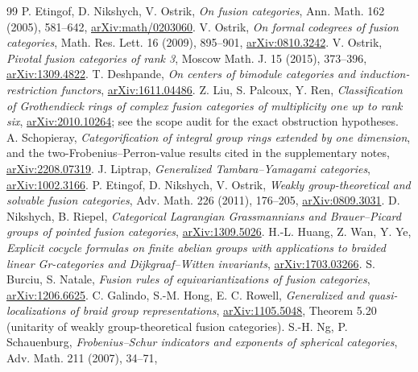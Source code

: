 \documentclass[11pt]{article}
\begin{document}
\begin{thebibliography}{99}
 P. Etingof, D. Nikshych, V. Ostrik,
\emph{On fusion categories}, Ann. Math. 162 (2005), 581--642,
\href{https://arxiv.org/abs/math/0203060}{arXiv:math/0203060}.
 V. Ostrik, \emph{On formal codegrees of fusion
categories}, Math. Res. Lett. 16 (2009), 895--901,
\href{https://arxiv.org/abs/0810.3242}{arXiv:0810.3242}.
 V. Ostrik, \emph{Pivotal fusion categories of rank 3},
Moscow Math. J. 15 (2015), 373--396,
\href{https://arxiv.org/abs/1309.4822}{arXiv:1309.4822}.
 T. Deshpande, \emph{On centers of bimodule categories
and induction-restriction functors},
\href{https://arxiv.org/abs/1611.04486}{arXiv:1611.04486}.
 Z. Liu, S. Palcoux, Y. Ren, \emph{Classification of Grothendieck
rings of complex fusion categories of multiplicity one up to rank six},
\href{https://arxiv.org/abs/2010.10264}{arXiv:2010.10264}; see the scope
audit for the exact obstruction hypotheses.
 A. Schopieray, \emph{Categorification of integral
group rings extended by one dimension}, and the two-Frobenius--Perron-value
results cited in the supplementary notes,
\href{https://arxiv.org/abs/2208.07319}{arXiv:2208.07319}.
 J. Liptrap, \emph{Generalized Tambara--Yamagami categories},
\href{https://arxiv.org/abs/1002.3166}{arXiv:1002.3166}.
 P. Etingof, D. Nikshych, V. Ostrik,
\emph{Weakly group-theoretical and solvable fusion categories},
Adv. Math. 226 (2011), 176--205,
\href{https://arxiv.org/abs/0809.3031}{arXiv:0809.3031}.
 D. Nikshych, B. Riepel, \emph{Categorical Lagrangian
Grassmannians and Brauer--Picard groups of pointed fusion categories},
\href{https://arxiv.org/abs/1309.5026}{arXiv:1309.5026}.
 H.-L. Huang, Z. Wan, Y. Ye, \emph{Explicit cocycle formulas
on finite abelian groups with applications to braided linear Gr-categories
and Dijkgraaf--Witten invariants},
\href{https://arxiv.org/abs/1703.03266}{arXiv:1703.03266}.
 S. Burciu, S. Natale, \emph{Fusion rules of equivariantizations
of fusion categories},
\href{https://arxiv.org/abs/1206.6625}{arXiv:1206.6625}.
 C. Galindo, S.-M. Hong, E. C. Rowell,
\emph{Generalized and quasi-localizations of braid group representations},
\href{https://arxiv.org/abs/1105.5048}{arXiv:1105.5048},
Theorem 5.20 (unitarity of weakly group-theoretical fusion categories).
 S.-H. Ng, P. Schauenburg,
\emph{Frobenius--Schur indicators and exponents of spherical categories},
Adv. Math. 211 (2007), 34--71,

\end{thebibliography}
\end{document}

